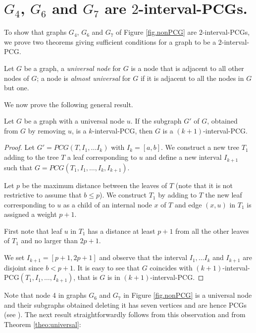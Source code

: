 \documentclass{fundam}
\newcommand{\Int}[1]{$#1$\textnormal{-interval-PCG}}
\begin{document}
\section{$G_4$, $G_6$ and $G_7$ are \Int{2}s.}

To show that graphs $G_4$, $G_6$ and $G_7$ of Figure \ref{fig.nonPCG} are \Int{2}s, we prove two theorems giving sufficient conditions for a graph to be a \Int{2}.

Let $G$ be a graph, a {\em universal node} for $G$ is  a node that is adjacent to all other nodes of $G$; a node is {\em almost universal} for $G$
if it is adjacent to all the nodes in $G$ but one.

We now prove the following general result.

\begin{theorem}
\label{theo:universal}
Let $G$ be a graph with a universal node $u$.
If the subgraph $G'$ of $G$, obtained from $G$ by removing $u$, is  a \Int{k}, then $G$ is a \Int{(k+1)}.
\end{theorem}

\begin{proof}
Let $G'=PCG(T,I_1,\ldots I_k)$ with $I_k=[a,b]$.
We construct a  new tree $T_1$ adding to the tree $T$ a leaf corresponding to $u$ and define a new interval $I_{k+1}$ such that $G=PCG(T_1, I_1, \ldots, I_k, I_{k+1})$.

Let $p$ be the maximum distance between the leaves of $T$ (note that it is not restrictive to assume that $b\leq p$).
We construct $T_1$ by adding to $T$ the new leaf corresponding to $u$ as a child of an internal node $x$ of $T$ and edge $(x,u)$ in $T_1$ is assigned a weight $p+1$.

First note that leaf $u$ in $T_1$ has a distance at least $p+1$  from all the other leaves of $T_1$ and no larger than $2p+1$.

We set $I_{k+1}=[p+1,2p+1]$ and observe that the interval $I_1,\ldots I_k$ and $I_{k+1}$ are disjoint
since $b<p+1$. It is easy to see that $G$ coincides with \Int{(k+1)}$(T_1,I_1,\ldots, I_{k+1})$, that is $G$ is in \Int{(k+1)}.
\end{proof}

\noindent
Note that node 4 in graphs $G_6$ and $G_7$ in Figure \ref{fig.nonPCG} is a universal node and their subgraphs obtained deleting it has seven vertices and are hence PCGs (see \cite{Calamoneri2012}).
The next result straightforwardly follows from this observation and from Theorem \ref{theo:universal}:
\end{document}
